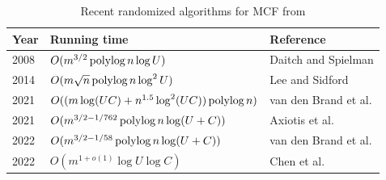 \begin{table}[ht!]
\centering

\begin{tabular}{@{}lll@{}}
\toprule
\textbf{Year}       & \textbf{Running time}          & \textbf{Reference}  \\        
\midrule
2008      & \(O(m^{3/2}\,\text{polylog}\, n\log U)\)               & Daitch and Spielman \cite{daitch2008} \\
2014      & \(O(m \sqrt{n}\,\text{polylog}\, n \log^2 U)\) & Lee and Sidford \cite{lee2014}\\
2021 & \(O((m \log(U C) + n^{1.5} \log^2(UC))\,\text{polylog}\, n)\) & van den Brand et al. \cite{brand2021} \\
2021 & \(O(m^{3/2-1/762}\,\text{polylog}\, n \log (U+C)) \) & Axiotis et al. \cite{axiotis2021} \\
2022 & \(O(m^{3/2-1/58}\,\text{polylog}\, n \log(U+C))\) & van den Brand et al. \cite{brand2022} \\
2022 & \(O(m^{1+o(1)}\log U \log C)\) & Chen et al. \cite{chen2022} \\

\bottomrule
\end{tabular}

\caption{Recent randomized algorithms for MCF from \cite{algorithms-survey}}
\label{tab:randomized}
\end{table}

